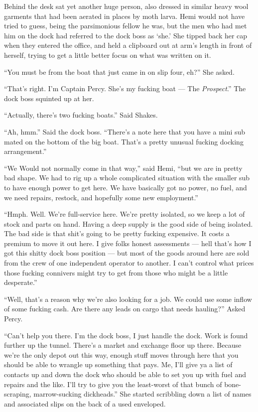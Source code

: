 \documentclass[]{scrbook}
\begin{document}
Behind the desk sat yet another huge person, also dressed in similar
heavy wool garments that had been aerated in places by moth larva. Hemi
would not have tried to guess, being the parsimonious fellow he was, but
the men who had met him on the dock had referred to the dock boss as
`she.' She tipped back her cap when they entered the office, and held a
clipboard out at arm's length in front of herself, trying to get a
little better focus on what was written on it.

``You must be from the boat that just came in on slip four, eh?'' She
asked.

``That's right. I'm Captain Percy. She's my fucking boat --- The
\emph{Prospect}.'' The dock boss squinted up at her.

``Actually, there's two fucking boats.'' Said Shakes.

``Ah, hmm.'' Said the dock boss. ``There's a note here that you have a
mini sub mated on the bottom of the big boat. That's a pretty unusual
fucking docking arrangement.''

``We Would not normally come in that way,'' said Hemi, ``but we are in
pretty bad shape. We had to rig up a whole complicated situation with
the smaller sub to have enough power to get here. We have basically got
no power, no fuel, and we need repairs, restock, and hopefully some new
employment.''

``Hmph. Well. We're full-service here. We're pretty isolated, so we keep
a lot of stock and parts on hand. Having a deep supply is the good side
of being isolated. The bad side is that shit's going to be pretty
fucking expensive. It costs a premium to move it out here. I give folks
honest assessments --- hell that's how I got this shitty dock boss
position --- but most of the goods around here are sold from the crew of
one independent operator to another. I can't control what prices those
fucking connivers might try to get from those who might be a little
desperate.''

``Well, that's a reason why we're also looking for a job. We could use
some inflow of some fucking cash. Are there any leads on cargo that
needs hauling?'' Asked Percy.

``Can't help you there. I'm the dock boss, I just handle the dock. Work
is found further up the tunnel. There's a market and exchange floor up
there. Because we're the only depot out this way, enough stuff moves
through here that you should be able to wrangle up something that pays.
Me, I'll give ya a list of contacts up and down the dock who should be
able to set you up with fuel and repairs and the like. I'll try to give
you the least-worst of that bunch of bone-scraping, marrow-sucking
dickheads.'' She started scribbling down a list of names and associated
slips on the back of a used enveloped.
\end{document}
